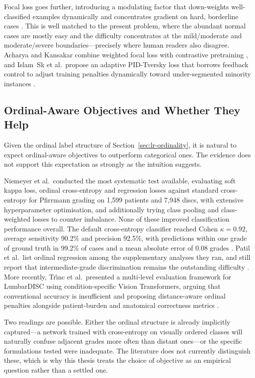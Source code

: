 Focal loss goes further, introducing a modulating factor that down-weights
well-classified examples dynamically and concentrates gradient on hard,
borderline cases \cite{lin2017focal}. This is well matched to the present
problem, where the abundant normal cases are mostly easy and the difficulty
concentrates at the mild/moderate and moderate/severe boundaries---precisely
where human readers also disagree. Acharya and Kansakar combine weighted focal
loss with contrastive pretraining \cite{acharya2026disccentric}, and Islam~Sk et
al.\ propose an adaptive PID-Tversky loss that borrows feedback control to adjust
training penalties dynamically toward under-segmented minority instances
\cite{islamsk2026an}.

\subsection{Ordinal-Aware Objectives and Whether They Help}
\label{sec:lr-ordinal-losses}

Given the ordinal label structure of Section~\ref{sec:lr-ordinality}, it is
natural to expect ordinal-aware objectives to outperform categorical ones. The
evidence does not support this expectation as strongly as the intuition
suggests.

Niemeyer et al.\ conducted the most systematic test available, evaluating soft
kappa loss, ordinal cross-entropy and regression losses against standard
cross-entropy for Pfirrmann grading on 1{,}599 patients and 7{,}948 discs, with
extensive hyperparameter optimisation, and additionally trying class pooling and
class-weighted losses to counter imbalance. None of these improved classification
performance overall. The default cross-entropy classifier reached Cohen
$\kappa = 0.92$, average sensitivity 90.2\% and precision 92.5\%, with
predictions within one grade of ground truth in 99.2\% of cases and a mean
absolute error of 0.08 grades \cite{niemeyer2021a}. Patil et al.\ list ordinal
regression among the supplementary analyses they ran, and still report that
intermediate-grade discrimination remains the outstanding difficulty
\cite{patil2026mribased}. More recently, Tr{\^\i}nc et al.\ presented a
multi-level evaluation framework for LumbarDISC using condition-specific Vision
Transformers, arguing that conventional accuracy is insufficient and proposing
distance-aware ordinal penalties alongside patient-burden and anatomical
correctness metrics \cite{trinc2026beyond}.

Two readings are possible. Either the ordinal structure is already implicitly
captured---a network trained with cross-entropy on visually ordered classes will
naturally confuse adjacent grades more often than distant ones---or the specific
formulations tested were inadequate. The literature does not currently
distinguish these, which is why this thesis treats the choice of objective as an
empirical question rather than a settled one.

